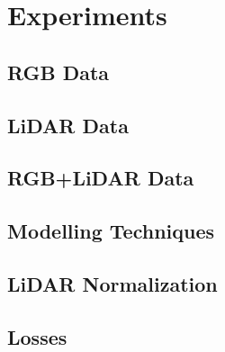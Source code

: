 \section{Experiments}%
\label{sec:experiments}

\subsection{RGB Data}%
\label{sec:rgb-experiment}


\subsection{LiDAR Data}


\subsection{RGB+LiDAR Data}


\subsection{Modelling Techniques}


\subsection{LiDAR Normalization}


\subsection{Losses}

